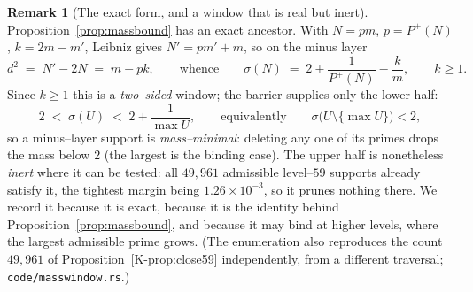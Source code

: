 \documentclass[11pt]{article}
\theoremstyle{definition}
\newtheorem{remark}[theorem]{Remark}
\begin{document}
\begin{remark}[The exact form, and a window that is real but inert]\label{rem:masswindow}
Proposition~\ref{prop:massbound} has an exact ancestor. With $N=pm$, $p=P^+(N)$, $k=2m-m'$, Leibniz
gives $N'=pm'+m$, so on the minus layer
\[ d^2\;=\;N'-2N\;=\;m-pk,\qquad\text{whence}\qquad
   \sigma(N)\;=\;2+\frac1{P^+(N)}-\frac km,\qquad k\ge1. \]
Since $k\ge1$ this is a \emph{two--sided} window; the barrier supplies only the lower half:
\[ 2\;<\;\sigma(U)\;<\;2+\frac1{\max U},\qquad\text{equivalently}\qquad \sigma\bigl(U\setminus\{\max U\}\bigr)<2, \]
so a minus--layer support is \emph{mass--minimal}: deleting any one of its primes drops the mass below
$2$ (the largest is the binding case). The upper half is nonetheless \emph{inert} where it can be
tested: all $49{,}961$ admissible level--$59$ supports already satisfy it, the tightest margin being
$1.26\times10^{-3}$, so it prunes nothing there. We record it because it is exact, because it is the
identity behind Proposition~\ref{prop:massbound}, and because it may bind at higher levels, where the
largest admissible prime grows. (The enumeration also reproduces the count $49{,}961$ of
Proposition~\ref{K-prop:close59} independently, from a different traversal;
\texttt{code/masswindow.rs}.)
\end{remark}
\end{document}
